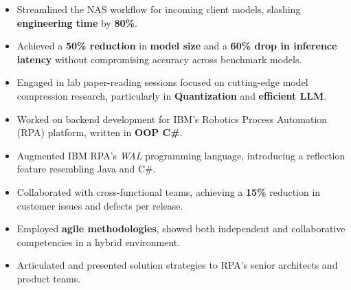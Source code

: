 \documentclass[10pt,a4paper,ragged2e,withhyper]{altacv}
\begin{document}
\begin{paracol}{2}
\begin{itemize}
        \item Streamlined the NAS workflow for incoming client models, slashing
              \textbf{engineering time} by \textbf{80\%}.

        \item Achieved a \textbf{50\% reduction} in \textbf{model size} and a
              \textbf{60\% drop in inference latency} without compromising accuracy across benchmark models.

        \item Engaged in lab paper-reading sessions focused on cutting-edge model compression
              research, particularly in \textbf{Quantization} and \textbf{efficient LLM}.


    \end{itemize}

    \divider{}


    \begin{itemize}

        \item Worked on backend development for IBM's Robotics Process Automation (RPA) platform, written in  \textbf{OOP C\#}.

        \item Augmented IBM RPA's \textit{WAL} programming
              language, introducing a reflection feature resembling Java and C\#.

        \item Collaborated with cross-functional teams, achieving a \textbf{15\%} reduction in customer issues and defects per release.

        \item Employed \textbf{agile methodologies}, showed both independent and
              collaborative competencies in a hybrid environment.

        \item Articulated and presented solution strategies to RPA's senior architects and product teams.



\end{itemize}
\end{paracol}
\end{document}
